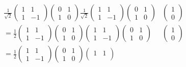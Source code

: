 \begin{align}
    \frac{1}{\sqrt{2}}
    \begin{pmatrix}
        1 & 1 \\
        1 & -1
    \end{pmatrix}
    \begin{pmatrix}
        0 & 1 \\
        1 & 0
    \end{pmatrix} 
    \frac{1}{\sqrt{2}}
    \begin{pmatrix}
        1 & 1 \\
        1 & -1
    \end{pmatrix}
    \begin{pmatrix}
        0 & 1 \\
        1 & 0
    \end{pmatrix} 
    &\begin{pmatrix}
        1 \\
        0
    \end{pmatrix} \\
    =
    \frac{1}{2}
    \begin{pmatrix}
        1 & 1 \\
        1 & -1
    \end{pmatrix}
    \begin{pmatrix}
        0 & 1 \\
        1 & 0
    \end{pmatrix} 
    \begin{pmatrix}
        1 & 1 \\
        1 & -1
    \end{pmatrix}
    \begin{pmatrix}
        0 & 1 \\
        1 & 0
    \end{pmatrix} 
    &\begin{pmatrix}
        1 \\
        0
    \end{pmatrix} \\
    =
    \frac{1}{2}
    \begin{pmatrix}
        1 & 1 \\
        1 & -1
    \end{pmatrix}
    \begin{pmatrix}
        0 & 1 \\
        1 & 0
    \end{pmatrix} 
    \begin{pmatrix}
        1 & 1 \\

\end{pmatrix}
\end{align}
